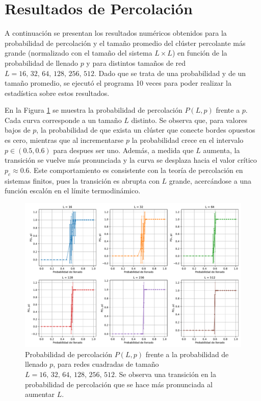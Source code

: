 \documentclass{article}
\begin{document}
\section{Resultados de Percolación}

A continuación se presentan los resultados numéricos obtenidos para la probabilidad de percolación y el tamaño promedio del clúster percolante más grande (normalizado con el tamaño del sistema \( L \times L \)) en función de la probabilidad de llenado \(p\) y para distintos tamaños de red \(L = 16,\,32,\,64,\,128,\,256,\,512\). Dado que se trata de una probabilidad y de un tamaño promedio, se ejecutó el programa 10 veces para poder realizar la estadística sobre estos resultados.

En la Figura \ref{fig:perc_prob} se muestra la probabilidad de percolación \(P(L,p)\) frente a \(p\). Cada curva corresponde a un tamaño \(L\) distinto. Se observa que, para valores bajos de \(p\), la probabilidad de que exista un clúster que conecte bordes opuestos es cero, mientras que al incrementarse \(p\) la probabilidad crece en el intervalo \(p\in(0.5, 0.6)\) para despues ser uno. Además, a medida que \(L\) aumenta, la transición se vuelve más pronunciada y la curva se desplaza hacia el valor crítico \(p_c \approx 0.6\). Este comportamiento es consistente con la teoría de percolación en sistemas finitos, pues la transición es abrupta con \(L\) grande, acercándose a una función escalón en el límite termodinámico.

\begin{figure}[ht]
    \centering
    \includegraphics[width=1.0\textwidth]{figures/Perc_prob.pdf}
    \caption{Probabilidad de percolación \(P(L,p)\) frente a la probabilidad de llenado \(p\), para redes cuadradas de tamaño \(L = 16,\,32,\,64,\,128,\,256,\,512\). Se observa una transición en la probabilidad de percolación que se hace más pronunciada al aumentar \(L\).}
    \label{fig:perc_prob}
\end{figure}
\end{document}
